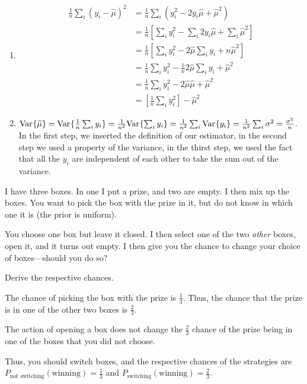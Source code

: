 \begin{solution}
\begin{enumerate}
    \item \begin{align*}
        \frac{1}{n} \sum_i (y_i - \hat\mu)^2 &= \frac{1}{n} \sum_i (y_i^2 - 2y_i\hat\mu + {\hat\mu}^2) \\
        &= \frac{1}{n} \left[\sum_i y_i^2 - \sum_i 2y_i\hat\mu + \sum_i{\hat\mu}^2 \right]\\
        &= \frac{1}{n} \left[\sum_i y_i^2 - 2\hat\mu\sum_i y_i + n{\hat\mu}^2 \right]\\
        &= \frac{1}{n} \sum_i y_i^2 - \frac{1}{n} 2\hat\mu\sum_i y_i + {\hat\mu}^2\\
        &= \frac{1}{n} \sum_i y_i^2 - 2\hat\mu\hat\mu + {\hat\mu}^2\\
        &= \left[\frac{1}{n} \sum_i y_i^2\right] - {\hat\mu}^2
    \end{align*}
    \item $\text{Var}_{}\{\widehat{\mu}\} = \text{Var}_{}\{\frac{1}{n} \sum_i y_i\} = \frac{1}{n^2}\text{Var}_{}\{ \sum_i y_i\} = \frac{1}{n^2}\sum_i\text{Var}_{}\{ y_i\} = \frac{1}{n^2}\sum_i \sigma^2 = \frac{\sigma^2}{n}$. \\
    In the first step, we inserted the definition of our estimator, in the second step we used a property of the variance, in the thirst step, we used the fact that all the $y_i$ are independent of each other to take the sum out of the variance.
\end{enumerate}
\end{solution}



I have three boxes. In one I put a prize, and two are empty. I then
mix up the boxes. You want to pick the box with the prize in it, but do not know in which one it is (the prior is uniform).

You choose one box but leave it closed. I then select one of the
two \emph{other} boxes, open it, and it turns out empty. I then give
you the chance to change your choice of boxes---should you do so?

Derive the respective chances.

\begin{solution}
    The chance of picking the box with the prize is $\frac{1}{3}$. Thus, the chance that the prize is in one of the other two boxes is $\frac{2}{3}$.

    The action of opening a box does not change the $\frac{2}{3}$ chance of the prize being in one of the boxes that you did not choose.

    Thus, you should switch boxes, and the respective chances of the strategies are $P_\text{not switching}(\text{winning}) = \frac{1}{3}$ and $P_\text{switching}(\text{winning}) = \frac{2}{3}$.
\end{solution}

